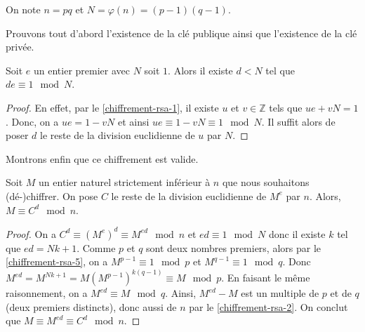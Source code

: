   \begin{notation}
    On note $n = pq$ et $N = \varphi(n) = (p-1)(q-1)$.
  \end{notation}

  Prouvons tout d'abord l'existence de la clé publique ainsi que l'existence de la clé privée.

  \begin{proposition}
    Soit $e$ un entier premier avec $N$ soit $1$. Alors il existe $d < N$ tel que $de \equiv 1 \mod N$.
  \end{proposition}

  \begin{proof}
    En effet, par le \cref{chiffrement-rsa-1}, il existe $u$ et $v \in \mathbb{Z}$ tels que $ue + vN = 1$. Donc, on a $ue = 1 - vN$ et ainsi $ue \equiv 1 - vN \equiv 1 \mod N$. Il suffit alors de poser $d$ le reste de la division euclidienne de $u$ par $N$.
  \end{proof}

  Montrons enfin que ce chiffrement est valide.

  \begin{proposition}
    Soit $M$ un entier naturel strictement inférieur à $n$ que nous souhaitons (dé-)chiffrer. On pose $C$ le reste de la division euclidienne de $M^e$ par $n$. Alors, $M \equiv C^d \mod n$.
  \end{proposition}

  \begin{proof}
    On a $C^d \equiv (M^e)^d \equiv M^{ed} \mod n$ et $ed \equiv 1 \mod N$ donc il existe $k$ tel que $ed = Nk + 1$. Comme $p$ et $q$ sont deux nombres premiers, alors par le \cref{chiffrement-rsa-5}, on a $M^{p-1} \equiv 1 \mod p$ et $M^{q-1} \equiv 1 \mod q$. Donc $M^{ed} = M^{Nk + 1} = M(M^{p-1})^{k(q-1)} \equiv M \mod p$. En faisant le même raisonnement, on a $M^{ed} \equiv M \mod q$. Ainsi, $M^{ed}-M$ est un multiple de $p$ et de $q$ (deux premiers distincts), donc aussi de $n$ par le \cref{chiffrement-rsa-2}. On conclut que $M \equiv M^{ed} \equiv C^d \mod n$.
  \end{proof}

